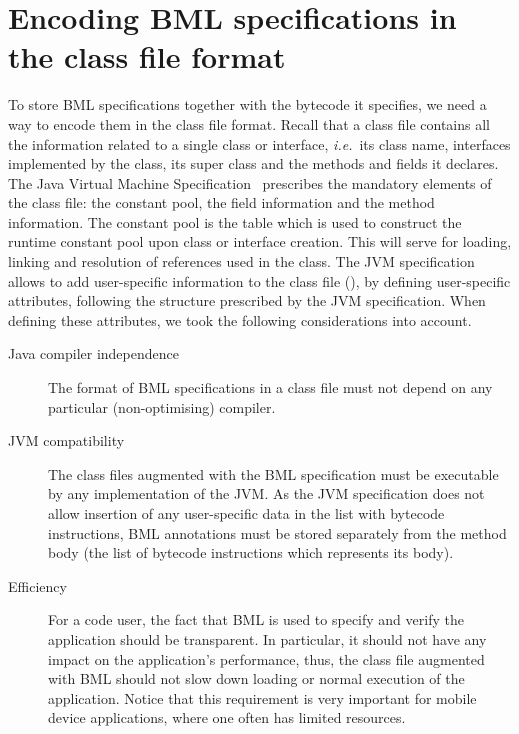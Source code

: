 \section{Encoding BML specifications in the class file format}
\label{SecClassfile}

To store BML specifications together with the bytecode it
specifies, we need a way to encode them in the class file
format. Recall that a class file contains all the information related
to a single class or interface, \emph{i.e.}\ its class name, interfaces
implemented by the class, its super class and the methods and fields
it declares. The Java Virtual Machine Specification~\cite{JVMspec}
prescribes the mandatory elements of the class file: the constant
pool, the field information and the method information. The constant
pool is the table which is used to construct the runtime constant pool
upon class or interface creation. This will serve for loading, linking
and resolution of references used in the class. The JVM specification
allows to add user-specific information to the class file
(\cite[\S4.7.1]{JVMspec}), by defining user-specific attributes,
following the structure prescribed by the JVM specification. When
defining these attributes, we took the following considerations into
account.

\begin{description}
\item [Java compiler independence]
The format of BML specifications in a class file must not depend on
any particular (non-optimising) compiler.
    
      
\item [JVM compatibility]
The class files augmented with the BML specification must be
executable by any implementation of the JVM.  As the JVM specification
does not allow insertion of any user-specific data in the list with
bytecode instructions, BML annotations must be stored separately from
the method body (the list of bytecode instructions which represents
its body).

\item[Efficiency]
For a code user, the fact that BML is used to specify and verify the
application should be transparent. In particular, it should not have
any impact on the application's performance, thus, the class file
augmented with BML should not slow down loading or normal execution of
the application. Notice that this requirement is very important for
mobile device applications, where one often has limited resources. 
\end{description}	  


